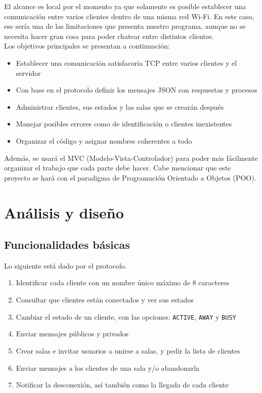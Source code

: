 \documentclass[12pt,a4paper]{article}
\begin{document}
\noindent El alcance es local por el momento ya que solamente es posible establecer una
comunicación entre varios clientes dentro de una misma red Wi-Fi. En este caso,
ese sería una de las limitaciones que presenta nuestro programa, aunque no se
necesita hacer gran cosa para poder chatear entre distintos clientes.
\\[0.5cm]
\noindent Los objetivos principales se presentan a continuación:
\begin{itemize}
  \item Establecer una comunicación satisfacoria TCP entre varios clientes y el servidor
  \item Con base en el protocolo definir los mensajes JSON con respuestas y procesos
  \item Administrar clientes, sus estados y las salas que se crearán después
  \item Manejar posibles errores como de identificación o clientes inexistentes
  \item Organizar el código y asignar nombres coherentes a todo\\[0.1cm]
\end{itemize}

\noindent Además, se usará el MVC (Modelo-Vista-Controlador) para poder más fácilmente
organizar el trabajo que cada parte debe hacer. Cabe mencionar que este proyecto
se hará con el paradigma de Programación Orientado a Objetos (POO).

\newpage
\section*{Análisis y diseño}


\subsection*{Funcionalidades básicas}

\noindent Lo siguiente está dado por el protocolo.

\begin{enumerate}
  \item Identificar cada cliente con un nombre único máximo de 8 caracteres
  \item Consultar que clientes están conectados y ver sus estados
  \item Cambiar el estado de un cliente, con las opciones: \texttt{ACTIVE}, \texttt{AWAY} y \texttt{BUSY}
  \item Enviar mensajes públicos y privados
  \item Crear salas e invitar usuarios a unirse a salas, y pedir la lista de clientes
  \item Enviar mensajes a los clientes de una sala y/o abandonarla
  \item Notificar la desconexión, así también como la llegada de cada cliente
\end{enumerate}
\end{document}
